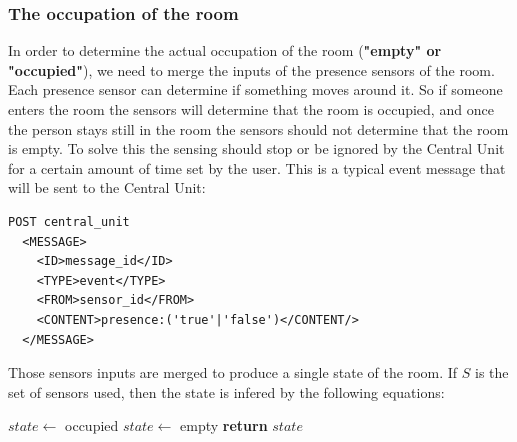 \documentclass{acm_proc_article-sp}
\begin{document}
 \subsubsection*{The occupation of the room}
 In order to determine the actual occupation of the room (\textbf{"empty" or "occupied"}), we need to merge the inputs of the presence sensors of the room.
 Each presence sensor can determine if something moves around it. 
 So if someone enters the room the sensors will determine that the room is occupied, and once the person stays still in the room the sensors should not determine that the room is empty. 
 To solve this the sensing should stop or be ignored by the Central Unit for a certain amount of time set by the user.
 This is a typical event message that will be sent to the Central Unit:
 
 \begin{minipage}{\linewidth}
\begin{lstlisting}
POST central_unit 
  <MESSAGE>
    <ID>message_id</ID>
    <TYPE>event</TYPE>
    <FROM>sensor_id</FROM>
    <CONTENT>presence:('true'|'false')</CONTENT/>
  </MESSAGE> 
\end{lstlisting}
\end{minipage}

Those sensors inputs are merged to produce a single state of the room.
If $S$ is the set of sensors used, then the state is infered by the following equations:
 \begin{description}
 \begin{algorithm}
  \begin{algorithmic}
      \State $state\gets$ occupied
    \Else
      \State $state\gets$ empty
  \EndIf
  \State \textbf{return} $state$
  \end{algorithmic}
  \end{algorithm}
 \end{description}
\end{document}
